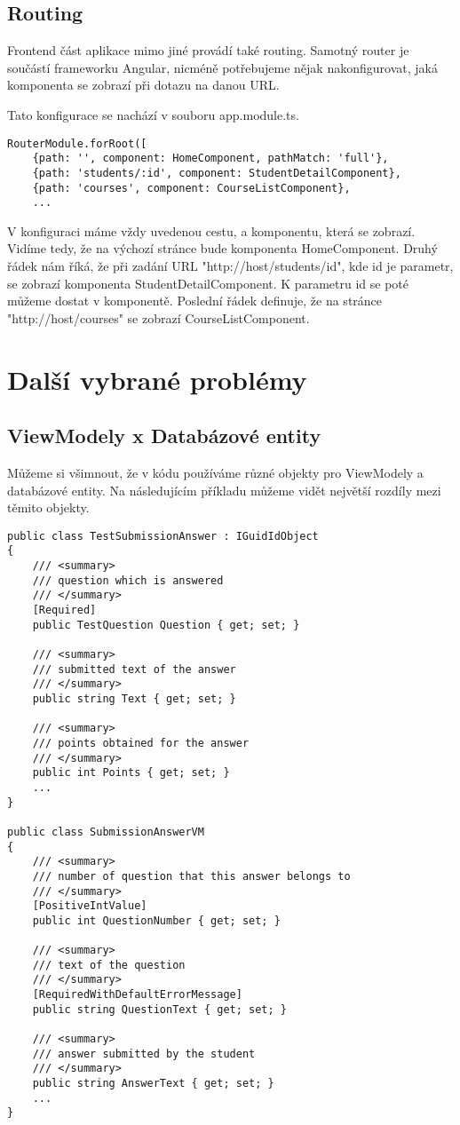 \newpage

\subsection{Routing}

Frontend část aplikace mimo jiné provádí také routing. Samotný router je součástí frameworku Angular, nicméně potřebujeme nějak nakonfigurovat, jaká komponenta se zobrazí při dotazu na danou URL.

Tato konfigurace se nachází v souboru app.module.ts.
\lstset{style=typescript}
\begin{lstlisting}
RouterModule.forRoot([
	{path: '', component: HomeComponent, pathMatch: 'full'},
	{path: 'students/:id', component: StudentDetailComponent},
	{path: 'courses', component: CourseListComponent},
	...
\end{lstlisting}

V konfiguraci máme vždy uvedenou cestu, a komponentu, která se zobrazí.
Vidíme tedy, že na výchozí stránce bude komponenta HomeComponent. 
Druhý řádek nám říká, že při zadání URL "http://host/students/id", kde id je parametr, se zobrazí komponenta StudentDetailComponent. K parametru id se poté můžeme dostat v komponentě.
Poslední řádek definuje, že na stránce "http://host/courses" se zobrazí CourseListComponent.

\newpage

\section{Další vybrané problémy}

\subsection{ViewModely x Databázové entity}

Můžeme si všimnout, že v kódu používáme různé objekty pro ViewModely a databázové entity. 
Na následujícím příkladu můžeme vidět největší rozdíly mezi těmito objekty.

\lstset{style=sharpc}
\begin{lstlisting}
public class TestSubmissionAnswer : IGuidIdObject
{	
	/// <summary>
	/// question which is answered
	/// </summary>
	[Required]
	public TestQuestion Question { get; set; }
	
	/// <summary>
	/// submitted text of the answer
	/// </summary>
	public string Text { get; set; }
	
	/// <summary>
	/// points obtained for the answer
	/// </summary>
	public int Points { get; set; }
	...
}

public class SubmissionAnswerVM
{	
	/// <summary>
	/// number of question that this answer belongs to
	/// </summary>
	[PositiveIntValue]
	public int QuestionNumber { get; set; }
	
	/// <summary>
	/// text of the question
	/// </summary>
	[RequiredWithDefaultErrorMessage]
	public string QuestionText { get; set; }
	
	/// <summary>
	/// answer submitted by the student
	/// </summary>
	public string AnswerText { get; set; }
	...
}
\end{lstlisting}

